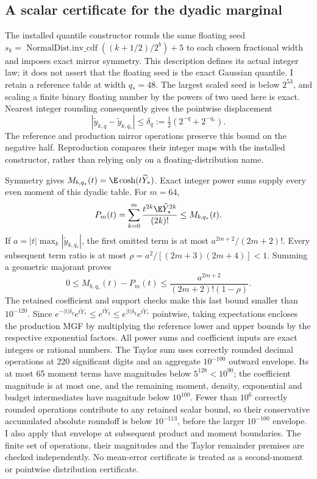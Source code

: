 \subsection{A scalar certificate for the dyadic marginal}

The installed quantile constructor rounds the same floating seed
$s_k=\operatorname{NormalDist.inv\_cdf}((k+1/2)/2^b)+5$ to each chosen
fractional width and imposes exact mirror symmetry. This description
defines its actual integer law; it does not assert that the floating seed
is the exact Gaussian quantile. I retain a reference table at width
$q_*=48$. The largest scaled seed is below $2^{53}$, and scaling a finite
binary floating number by the powers of two used here is exact. Nearest
integer rounding consequently gives the pointwise displacement
\begin{equation}\label{eq:rounding-marginal}
 |\widetilde y_{k,q}-\widetilde y_{k,q_*}|
 \leq \delta_q:=\tfrac12(2^{-q}+2^{-q_*}).
\end{equation}
The reference and production mirror operations preserve this bound on the
negative half. Reproduction compares their integer maps with the installed
constructor, rather than relying only on a floating-distribution name.

Symmetry gives $M_{b,q_*}(t)=\E\cosh(t\widetilde Y_*)$. Exact integer
power sums supply every even moment of this dyadic table. For $m=64$,
\begin{equation}
 P_m(t)=\sum_{k=0}^{m}\frac{t^{2k}\E\widetilde Y_*^{2k}}{(2k)!}
 \leq M_{b,q_*}(t).
\end{equation}
If $a=|t|\max_k|\widetilde y_{k,q_*}|$, the first omitted term is at
most $a^{2m+2}/(2m+2)!$. Every subsequent term ratio is at most
$\rho=a^2/[(2m+3)(2m+4)]<1$. Summing a geometric majorant proves
\begin{equation}
 0\leq M_{b,q_*}(t)-P_m(t)
 \leq\frac{a^{2m+2}}{(2m+2)!(1-\rho)}.
\end{equation}
The retained coefficient and support checks make this last bound smaller
than $10^{-120}$. Since
$e^{-|t|\delta_q}e^{t\widetilde Y_*}\leq
 e^{t\widetilde Y_q}\leq
 e^{|t|\delta_q}e^{t\widetilde Y_*}$ pointwise, taking expectations
encloses the production MGF by multiplying the reference lower and upper
bounds by the respective exponential factors. All power sums and
coefficient inputs are exact integers or rational numbers. The Taylor sum
uses correctly rounded decimal operations at 220 significant digits and an
aggregate $10^{-100}$ outward envelope. Its at most 65 moment terms have
magnitudes below $5^{128}<10^{90}$; the coefficient magnitude is at most one,
and the remaining moment, density, exponential and budget intermediates
have magnitude below $10^{100}$. Fewer than $10^6$ correctly rounded
operations contribute to any retained scalar bound, so their conservative
accumulated absolute roundoff is below $10^{-113}$, before the larger
$10^{-100}$ envelope. I also apply that envelope at subsequent product and
moment boundaries. The finite set of operations, their magnitudes and the
Taylor remainder premises are checked independently. No mean-error certificate is treated
as a second-moment or pointwise distribution certificate.

